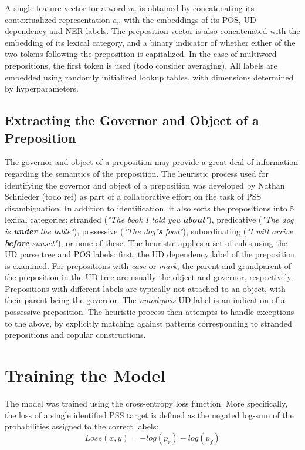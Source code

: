 A single feature vector for a word $w_i$ is obtained by concatenating its contextualized representation $c_i$, with the embeddings of its POS, UD dependency and NER labels. The preposition vector is also concatenated with the embedding of its lexical category, and a binary indicator of whether either of the two tokens following the preposition is capitalized. In the case of multiword prepositions, the first token is used (todo consider averaging). All labels are embedded using randomly initialized lookup tables, with dimensions determined by hyperparameters.

\subsection{Extracting the Governor and Object of a Preposition} \label{sec:govobj}

The governor and object of a preposition may provide a great deal of information regarding the semantics of the preposition. The heuristic process used for identifying the governor and object of a preposition was developed by Nathan Schnieder (todo ref) as part of a collaborative effort on the task of PSS disambiguation. In addition to identification, it also sorts the prepositions into 5 lexical categories: stranded (\emph{"The book I told you \textbf{about}"}), predicative (\emph{"The dog is \textbf{under} the table"}), possessive (\emph{"The dog\textbf{'s} food"}), subordinating (\emph{"I will arrive \textbf{before} sunset"}), or none of these. The heuristic applies a set of rules using the UD parse tree and POS labels: first, the UD dependency label of the preposition is examined. For prepositions with \emph{case} or \emph{mark}, the parent and grandparent of the preposition in the UD tree are usually the object and governor, respectively. Prepositions with different labels are typically not attached to an object, with their parent being the governor.  The \emph{nmod:poss} UD label is an indication of a possessive preposition. The heuristic process then attempts to handle exceptions to the above, by explicitly matching against patterns corresponding to stranded prepositions and copular constructions.  
\section{Training the Model} \label{sec:psstraining}

The model was trained using the cross-entropy loss function. More specifically, the loss of a single identified PSS target is defined as the negated log-sum of the probabilities assigned to the correct labels: 
$$ Loss(x, y) = - log(p_r) - log(p_f) $$

